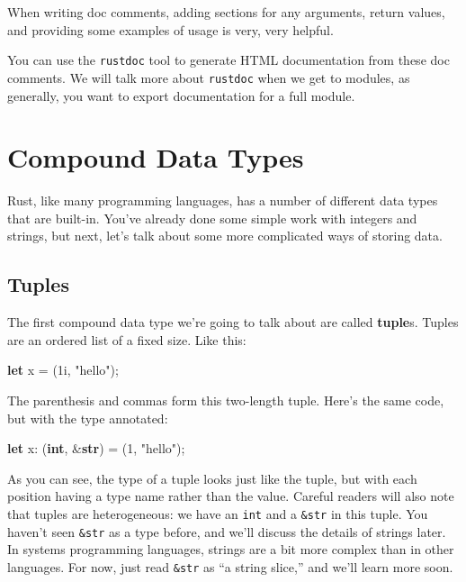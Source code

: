 \documentclass[]{article}
\newenvironment{Shaded}{}{}
\newcommand{\KeywordTok}[1]{\textcolor[rgb]{0.00,0.44,0.13}{\textbf{{#1}}}}
\newcommand{\DecValTok}[1]{\textcolor[rgb]{0.25,0.63,0.44}{{#1}}}
\newcommand{\StringTok}[1]{\textcolor[rgb]{0.25,0.44,0.63}{{#1}}}
\newcommand{\NormalTok}[1]{{#1}}
\begin{document}
When writing doc comments, adding sections for any arguments, return
values, and providing some examples of usage is very, very helpful.

You can use the \texttt{rustdoc} tool to generate HTML documentation
from these doc comments. We will talk more about \texttt{rustdoc} when
we get to modules, as generally, you want to export documentation for a
full module.

\section{Compound Data Types}\label{compound-data-types}

Rust, like many programming languages, has a number of different data
types that are built-in. You've already done some simple work with
integers and strings, but next, let's talk about some more complicated
ways of storing data.

\subsection{Tuples}\label{tuples}

The first compound data type we're going to talk about are called
\textbf{tuple}s. Tuples are an ordered list of a fixed size. Like this:

\begin{Shaded}
\begin{Highlighting}[]
\KeywordTok{let} \NormalTok{x = (}\DecValTok{1i}\NormalTok{, }\StringTok{"hello"}\NormalTok{);}
\end{Highlighting}
\end{Shaded}

The parenthesis and commas form this two-length tuple. Here's the same
code, but with the type annotated:

\begin{Shaded}
\begin{Highlighting}[]
\KeywordTok{let} \NormalTok{x: (}\KeywordTok{int}\NormalTok{, &}\KeywordTok{str}\NormalTok{) = (}\DecValTok{1}\NormalTok{, }\StringTok{"hello"}\NormalTok{);}
\end{Highlighting}
\end{Shaded}

As you can see, the type of a tuple looks just like the tuple, but with
each position having a type name rather than the value. Careful readers
will also note that tuples are heterogeneous: we have an \texttt{int}
and a \texttt{\&str} in this tuple. You haven't seen \texttt{\&str} as a
type before, and we'll discuss the details of strings later. In systems
programming languages, strings are a bit more complex than in other
languages. For now, just read \texttt{\&str} as ``a string slice,'' and
we'll learn more soon.
\end{document}
